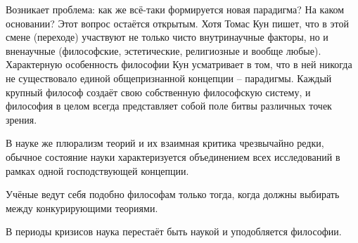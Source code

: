 \documentclass[exam_answers.tex]{subfiles}
\begin{document}
Возникает проблема: как же всё-таки формируется новая парадигма?
На каком основании?
Этот вопрос остаётся открытым.
Хотя Томас Кун пишет, что в этой смене (переходе) участвуют не только чисто внутринаучные факторы, но и вненаучные (философские, эстетические, религиозные и вообще любые).
\\

Характерную особенность философии Кун усматривает в том, что в ней никогда не существовало единой общепризнанной концепции – парадигмы.
Каждый крупный философ создаёт свою собственную философскую систему, и философия в целом всегда представляет собой поле битвы различных точек зрения.

В науке же плюрализм теорий и их взаимная критика чрезвычайно редки, обычное состояние науки характеризуется объединением всех исследований в рамках одной господствующей концепции.

Учёные ведут себя подобно философам только тогда, когда должны выбирать между конкурирующими теориями.

В периоды кризисов наука перестаёт быть наукой и уподобляется философии.
\end{document}
